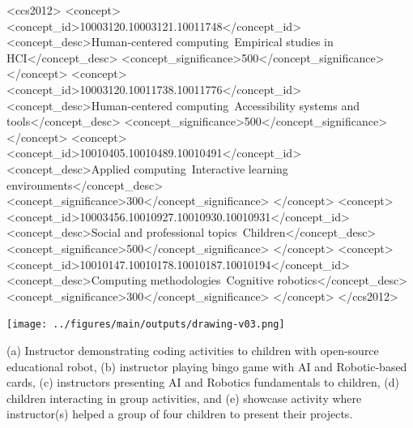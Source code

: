 \documentclass[sigconf]{acmart}
\begin{document}
\begin{CCSXML}
<ccs2012>
     <concept>
         <concept_id>10003120.10003121.10011748</concept_id>
         <concept_desc>Human-centered computing~Empirical studies in HCI</concept_desc>
         <concept_significance>500</concept_significance>
         </concept>
     <concept>
         <concept_id>10003120.10011738.10011776</concept_id>
         <concept_desc>Human-centered computing~Accessibility systems and tools</concept_desc>
         <concept_significance>500</concept_significance>
         </concept>
     <concept>
         <concept_id>10010405.10010489.10010491</concept_id>
         <concept_desc>Applied computing~Interactive learning environments</concept_desc>
         <concept_significance>300</concept_significance>
         </concept>
     <concept>
         <concept_id>10003456.10010927.10010930.10010931</concept_id>
         <concept_desc>Social and professional topics~Children</concept_desc>
         <concept_significance>500</concept_significance>
         </concept>
     <concept>
         <concept_id>10010147.10010178.10010187.10010194</concept_id>
         <concept_desc>Computing methodologies~Cognitive robotics</concept_desc>
         <concept_significance>300</concept_significance>
         </concept>
</ccs2012>
\end{CCSXML}



\begin{teaserfigure}
    \texttt{[image: ../figures/main/outputs/drawing-v03.png]} %
    \caption{
    (a) Instructor demonstrating coding activities to children with open-source educational robot,
    (b) instructor playing  bingo game with AI and Robotic-based cards,
    (c) instructors presenting AI and Robotics fundamentals to children,
    (d) children interacting in group activities, and 
    (e) showcase activity where instructor(s) helped a group of four children to present their projects. 
    }
    \label{fig:main}
\end{teaserfigure}
\end{document}
